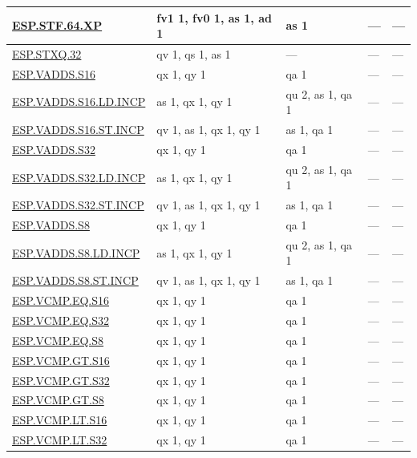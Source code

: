 \begin{longtable}[c]{|l|m{2.5cm}|m{2.5cm}|m{2.5cm}|m{2.5cm}|}
    \hyperref[instruction:ESPSTF64XP]{ESP.STF.64.XP} & fv1 1, fv0 1, as 1, ad 1 & as 1 & — & — \\\hline
    \hyperref[instruction:ESPSTXQ32]{ESP.STXQ.32} & qv 1, qs 1, as 1 & — & — & — \\\hline
    \hyperref[instruction:ESPVADDSS16]{ESP.VADDS.S16} & qx 1, qy 1 & qa 1 & — & — \\\hline
    \hyperref[instruction:ESPVADDSS16LDINCP]{ESP.VADDS.S16.LD.INCP} & as 1, qx 1, qy 1 & qu 2, as 1, qa 1 & — & — \\\hline
    \hyperref[instruction:ESPVADDSS16STINCP]{ESP.VADDS.S16.ST.INCP} & qv 1, as 1, qx 1, qy 1 & as 1, qa 1 & — & — \\\hline
    \hyperref[instruction:ESPVADDSS32]{ESP.VADDS.S32} & qx 1, qy 1 & qa 1 & — & — \\\hline
    \hyperref[instruction:ESPVADDSS32LDINCP]{ESP.VADDS.S32.LD.INCP} & as 1, qx 1, qy 1 & qu 2, as 1, qa 1 & — & — \\\hline
    \hyperref[instruction:ESPVADDSS32STINCP]{ESP.VADDS.S32.ST.INCP} & qv 1, as 1, qx 1, qy 1 & as 1, qa 1 & — & — \\\hline
    \hyperref[instruction:ESPVADDSS8]{ESP.VADDS.S8} & qx 1, qy 1 & qa 1 & — & — \\\hline
    \hyperref[instruction:ESPVADDSS8LDINCP]{ESP.VADDS.S8.LD.INCP} & as 1, qx 1, qy 1 & qu 2, as 1, qa 1 & — & — \\\hline
    \hyperref[instruction:ESPVADDSS8STINCP]{ESP.VADDS.S8.ST.INCP} & qv 1, as 1, qx 1, qy 1 & as 1, qa 1 & — & — \\\hline
    \hyperref[instruction:ESPVCMPEQS16]{ESP.VCMP.EQ.S16} & qx 1, qy 1 & qa 1 & — & — \\\hline
    \hyperref[instruction:ESPVCMPEQS32]{ESP.VCMP.EQ.S32} & qx 1, qy 1 & qa 1 & — & — \\\hline
    \hyperref[instruction:ESPVCMPEQS8]{ESP.VCMP.EQ.S8} & qx 1, qy 1 & qa 1 & — & — \\\hline
    \hyperref[instruction:ESPVCMPGTS16]{ESP.VCMP.GT.S16} & qx 1, qy 1 & qa 1 & — & — \\\hline
    \hyperref[instruction:ESPVCMPGTS32]{ESP.VCMP.GT.S32} & qx 1, qy 1 & qa 1 & — & — \\\hline
    \hyperref[instruction:ESPVCMPGTS8]{ESP.VCMP.GT.S8} & qx 1, qy 1 & qa 1 & — & — \\\hline
    \hyperref[instruction:ESPVCMPLTS16]{ESP.VCMP.LT.S16} & qx 1, qy 1 & qa 1 & — & — \\\hline
    \hyperref[instruction:ESPVCMPLTS32]{ESP.VCMP.LT.S32} & qx 1, qy 1 & qa 1 & — & — \\\hline

\end{longtable}
